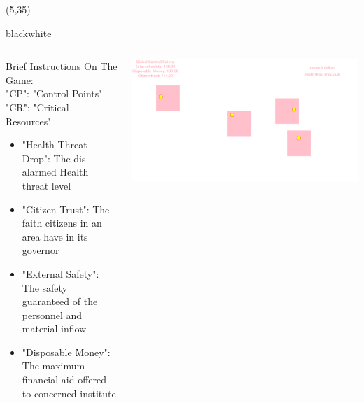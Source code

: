 \documentclass[hyperref={pdfpagelabels=false}]{beamer}
\begin{document}
\begin{frame}
	\begin{textblock}{90}(5,35)
		\begin{baseroundedbox}[]{black}{white}
			\begin{columns}
			\Large{	\begin{column}{0.55\columnwidth}
					Brief Instructions On The Game: \\
					"CP": "Control Points"\\
					"CR": "Critical Resources"\\
					\begin{multicols}{2}
						\begin{itemize}
							\item "Health Threat Drop": The dis-alarmed Health threat level
							\item "Citizen Trust": The faith citizens in an area have in its governor
							\item "External Safety": The safety guaranteed of the personnel and material inflow
							\item "Disposable Money": The maximum financial aid offered to concerned institute
						\end{itemize}
					\end{multicols}
				\end{column}
				\begin{column}{0.5\columnwidth}
					\centering
					\includegraphics[width=0.9\columnwidth]{img/WechatIMG1131}
				\end{column}}
			\end{columns}

		\end{baseroundedbox}
	\end{textblock}
	

\end{frame}
\end{document}
